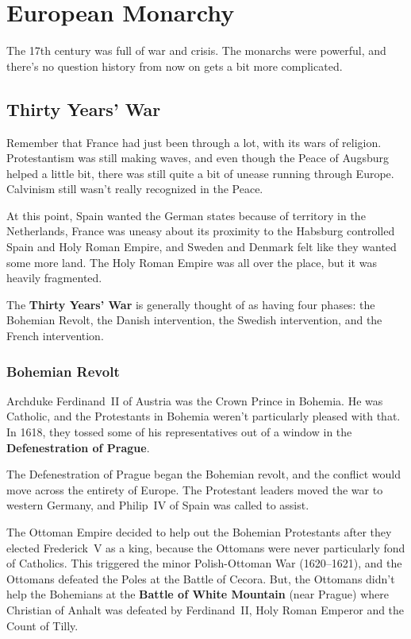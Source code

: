 \chapter{European Monarchy}

The 17th century was full of war and crisis.
The monarchs were powerful, and there's no question history from now on gets a bit more complicated.

\section{Thirty Years' War}

Remember that France had just been through a lot, with its wars of religion.
Protestantism was still making waves, and even though the Peace of Augsburg helped a little bit,
there was still quite a bit of unease running through Europe.
Calvinism still wasn't really recognized in the Peace.

At this point,
Spain wanted the German states because of territory in the Netherlands,
France was uneasy about its proximity to the Habsburg controlled Spain and Holy Roman Empire,
and Sweden and Denmark felt like they wanted some more land.
The Holy Roman Empire was all over the place, but it was heavily fragmented.

The \textbf{Thirty Years' War} is generally thought of as having four phases:
the Bohemian Revolt,
the Danish intervention,
the Swedish intervention,
and the French intervention.

\subsection*{Bohemian Revolt}

Archduke Ferdinand~II of Austria was the Crown Prince in Bohemia.
He was Catholic, and the Protestants in Bohemia weren't particularly pleased with that.
In 1618, they tossed some of his representatives out of a window in the \textbf{Defenestration of Prague}.

The Defenestration of Prague began the Bohemian revolt,
and the conflict would move across the entirety of Europe.
The Protestant leaders moved the war to western Germany,
and Philip~IV of Spain was called to assist.

The Ottoman Empire decided to help out the Bohemian Protestants after they elected Frederick~V as a king,
because the Ottomans were never particularly fond of Catholics.
This triggered the minor Polish-Ottoman War (1620--1621),
and the Ottomans defeated the Poles at the Battle of Cecora.
But, the Ottomans didn't help the Bohemians at the \textbf{Battle of White Mountain} (near Prague)
where Christian of Anhalt was defeated by Ferdinand~II, Holy Roman Emperor and the Count of Tilly.

